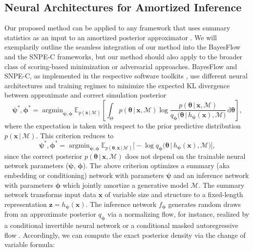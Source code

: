 \documentclass[twoside,11pt]{article}
\newcommand{\x}{\boldsymbol{x}}
\newcommand{\z}{\boldsymbol{z}}
\newcommand{\thetab}{\boldsymbol{\theta}}
\newcommand{\phib}{\boldsymbol{\phi}}
\newcommand{\psib}{\boldsymbol{\psi}}
\newcommand{\0}{\boldsymbol{0}}
\newcommand{\given}{\,|\,}
\newcommand{\postm}{p(\thetab \given \x, \mathcal{M})}
\newcommand{\jointm}{p(\thetab, \x \given \mathcal{M})}
\newcommand{\diff}{\mathrm{d}}
\newcommand{\M}{\mathcal{M}}
\DeclareMathOperator*{\argmin}{argmin}
\renewcommand{\cite}[1]{\citep{#1}}
\begin{document}
\subsection{Neural Architectures for Amortized Inference}

Our proposed method can be applied to any framework that uses summary statistics as an input to an amortized posterior approximator \cite{burkner2022some}.
We will exemplarily outline the seamless integration of our method into the BayesFlow \cite{bayesflow} and the SNPE-C \citep[aka APT;][]{apt} frameworks, but our method should also apply to the broader class of scoring-based minimization \cite{pacchiardi2022likelihood} or adversarial \cite{ramesh2022gatsbi} approaches.
BayesFlow and SNPE-C, as implemented in the respective software toolkits \cite{tejero2020sbi}, use different neural architectures and training regimes to minimize the expected KL divergence between approximate and correct simulation posterior
\begin{equation}
    \psib^*,\phib^* = \argmin_{\psib, \phib}\mathbb{E}_{p(\x \given \mathcal{M})}\left[\int_{\Theta} p(\thetab \given \x, \mathcal{M}) \log \frac{p(\thetab \given \x, \mathcal{M})}{q_{\phib}\big(\thetab \given h_{\psib}(\x), \mathcal{M}\big)}\, \diff\thetab\right], \label{eq:kl_bf_m}
\end{equation}
where the expectation is taken with respect to the prior predictive distribution $p(\x \given \mathcal{M})$. 
This criterion reduces to
\begin{equation}
  \psib^*, \phib^* =
  \argmin_{\psib, \phib}  
    \mathbb{E}_{\jointm}\Big[-\log q_{\phib}\big(\thetab\given h_{\psib}(\x), \mathcal{M}\big)\Big], \label{eq:kl_bf}
\end{equation}
since the correct posterior $\postm$ does not depend on the trainable neural network parameters ($\psib$, $\phib$).
The above criterion optimizes a summary (aka embedding or conditioning) network with parameters $\psib$ and an inference network with parameters $\phib$ which jointly amortize a generative model $\M$.
The summary network transforms input data $\x$ of variable size and structure to a fixed-length representation $\z = h_{\psib}(\x)$.
The inference network $f_{\phib}$ generates random draws from an approximate posterior $q_{\phib}$ via a normalizing flow, for instance, realized by a conditional invertible neural network \citep[cINN,][]{Ardizzone2019} or a conditional masked autoregressive flow \citep[cMAF,][]{papamakarios2017masked}.
Accordingly, we can compute the exact posterior density via the change of variable formula:
\end{document}
